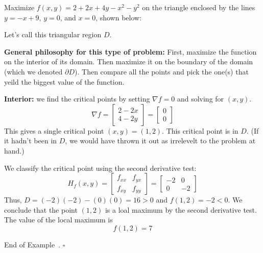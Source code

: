 \documentclass[10pt]{article}
\theoremstyle{definition}
\newtheorem{example}[theorem]{Example}
\renewenvironment{example}
{\begin{oldexample}}
  {\par\smallskip\hfill   End of Example~\theexample. $\square$    \par\end{oldexample}}
\newcommand{\vt}{\vskip 5mm} %
\newcommand{\fl}{\noindent\textbf} %
\newcommand{\Fl}{\vt\noindent\textbf} %
\newcommand{\1}[1]{\textbf{1}_{\left[#1\right]}} %
\begin{document}
\begin{example}
  Maximize $f(x,y) = 2+2x+4y-x^{2}-y^{2}$  on the triangle enclosed by the
  lines $y=-x+9$, $y=0$, and $x=0$, shown below:
  \begin{center}
  \end{center}
  Let's call this triangular region $D$.
  
  \Fl{General philosophy for this type of problem:} First, maximize the
  function on the interior of its domain. Then maximize it on the boundary of
  the domain (which we denoted $\partial D$). Then compare all the points and
  pick the one(s) that yeild the biggest value of the function.

  \fl{Interior:} we find the critical points by setting $\nabla f = 0$ and
  solving for $(x,y)$.
  \begin{equation*}
    \nabla  f =
    \begin{bmatrix}
      2-2x\\4-2y
    \end{bmatrix}
    =
    \begin{bmatrix}
      0\\0
    \end{bmatrix}
  \end{equation*}
  This gives a single critical point $(x,y) = (1,2)$. This critical point is
  in $D$. (If it hadn't been in $D$, we would have thrown it out as irrelevelt
  to the problem at hand.)

  We classify the critical point using the second derivative test:
  \begin{equation*}
    H_{f}(x,y) =
    \begin{bmatrix}
      f_{xx}&f_{yx}\\
      f_{xy}&f_{yy}
    \end{bmatrix}
    =
    \begin{bmatrix}
      -2&0\\
      0&-2
    \end{bmatrix}
  \end{equation*}
  Thus, $D= (-2)(-2)-(0)(0) = 16>0$ and $f(1,2) = -2<0$. We conclude that the
  point $(1,2)$ is a loal maximum by the second derivative test. The value of
  the local maximum is
  \begin{equation*}
    f(1,2) = 7
  \end{equation*}


\end{example}
\end{document}
